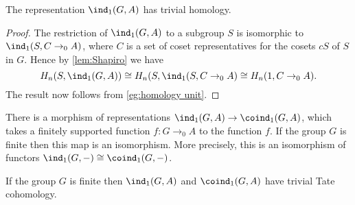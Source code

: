 \begin{lemma}	\label{lem:ind₁ trivial homology}
	\leanok
	The representation $\ind_1(G,A)$ has trivial homology.
\end{lemma}

\begin{proof}
	\leanok
	The restriction of $\ind_1(G,A)$ to a subgroup $S$ is
	isomorphic to $\ind_1(S, C \to_0 A)$, where $C$ is a set of coset representatives for the cosets $cS$ of $S$ in $G$.
	Hence by 	\ref{lem:Shapiro} we have
	\[
		H_n(S,\ind_1(G,A)) \cong H_n(S,\ind_1(S,C\to_0 A)\cong H_n(1,C \to_0 A).
	\]
	The result now follows from \ref{eg:homology unit}.
\end{proof}

\begin{definition} \label{def:ind₁ to coind₁}
	\leanok
	There is a morphism of representations $\ind_1(G,A) \to \coind_1(G,A)$,
	which takes a finitely supported function $f : G \to_0 A$ to the function $f$.
	If the group $G$ is finite then this map is an isomorphism.
	More precisely, this is an isomorphism of functors $\ind_1(G,-) \cong \coind_1(G,-)$.
\end{definition}

\begin{lemma}	\label{lem:induced trivial Tate}
	\leanok

	If the group $G$ is finite then $\ind_1(G,A)$ and $\coind_1(G,A)$ have trivial
	Tate cohomology.
\end{lemma}

